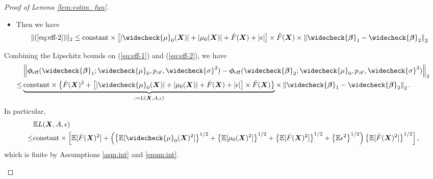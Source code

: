\documentclass[11pt]{article}
\numberwithin{equation}{section}
\theoremstyle{definition}
\theoremstyle{remark}
\newcommand{\bX}{\bm{X}}
\newcommand{\bbeta}{\bm{\beta}}
\newcommand{\bphi}{\bm{\phi}}
\newcommand{\bbE}{\mathbb{E}}
\newcommand{\sA}{\mathscr{A}}
\newcommand{\eff}{\mathrm{eff}}
\begin{document}
\begin{proof}[Proof of Lemma \ref{lem:estim_fun}]
\begin{enumerate}[label=(\Roman*),leftmargin=0cm]
\begin{itemize}
\begin{itemize}
				\item Then we have
				\[ \| (\ref{eq:eff-2}) \|_{2} \le \text{constant} \times \left[ |\widecheck{\mu}_{0}(\bX)| + |\mu_{0}(\bX)| + \dot{F}(\bX) + |\epsilon| \right] \times \ddot{F}(\bX) \times \left \| \widecheck{\bbeta}_{1} - \widecheck{\bbeta}_{2} \right \|_{2} \]
			\end{itemize}
		\end{itemize}
		Combining the Lipschitz bounds on (\ref{eq:eff-1}) and (\ref{eq:eff-2}), we have
		\begin{align*}
			&\left \| \bphi_{\eff}(\widecheck{\bbeta}_{1};\widecheck{\mu}_{0},p_{\sA},\widecheck{\sigma}^{2}) - \bphi_{\eff}(\widecheck{\bbeta}_{2};\widecheck{\mu}_{0},p_{\sA},\widecheck{\sigma}^{2}) \right \|_{2} \\
			\le& \underbrace{\text{constant} \times \left\{  \dot{F}(\bX)^{2} + \left[ |\widecheck{\mu}_{0}(\bX)| + |\mu_{0}(\bX)| + \dot{F}(\bX) + |\epsilon| \right] \times \ddot{F}(\bX) \right\}}_{:= L(\bX,A,\epsilon)} \times \left \| \widecheck{\bbeta}_{1} - \widecheck{\bbeta}_{2} \right \|_{2}.
		\end{align*}
		In particular,
		\begin{align*}
			&\bbE L(\bX,A,\epsilon) \\
			\le & \text{constant} \times \left [\bbE[\dot{F}(\bX)^{2}] +\left(  \left\{ \bbE[\widecheck{\mu}_{0}(\bX)^{2}] \right\}^{1/2} + \left\{ \bbE[\mu_{0}(\bX)^{2}] \right\}^{1/2} + \left\{ \bbE[\dot{F}(\bX)^{2}] \right\}^{1/2} + \left\{ \bbE \epsilon^{2} \right\}^{1/2} \right) \left\{ \bbE[\ddot{F}(\bX)^{2}] \right\}^{1/2}\right ],
		\end{align*}
		which is finite by Assumptions \ref{asm:int} and \ref{enum:int}.
		

\end{enumerate}
\end{proof}
\end{document}
